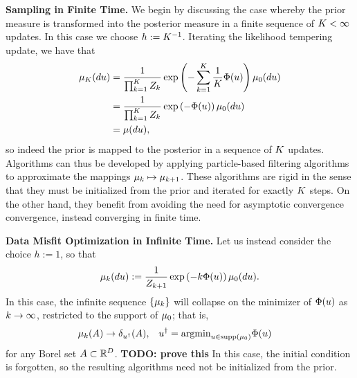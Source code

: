 \documentclass[12pt]{article}
\begin{document}
\bigskip
\noindent
\textbf{Sampling in Finite Time.} We begin by discussing the case whereby the prior measure is transformed into the posterior measure 
in a finite sequence of $K < \infty$ updates. In this case we choose $h := K^{-1}$. 
Iterating the likelihood tempering update, we have that 
\begin{align}
\mu_{K}(du) 
&= \frac{1}{\prod_{k=1}^{K} Z_{k}} \exp\left(-\sum_{k=1}^{K} \frac{1}{K} \Phi(u)  \right) \mu_0(du) \nonumber \\
&= \frac{1}{\prod_{k=1}^{K} Z_{k}} \exp\left(-\Phi(u)  \right) \mu_0(du) \nonumber \\
&= \mu(du),
\end{align}
so indeed the prior is mapped to the posterior in a sequence of $K$ updates. 
Algorithms can thus be developed by applying particle-based filtering algorithms to approximate the mappings $\mu_{k} \mapsto \mu_{k+1}$.  
These algorithms are rigid in the sense that they must be initialized from the prior and iterated for exactly $K$ steps. On the other hand, they benefit from 
avoiding the need for asymptotic convergence convergence, instead converging in finite time. 

\bigskip
\noindent
\textbf{Data Misfit Optimization in Infinite Time.} Let us instead consider the choice $h := 1$, so that  
\begin{align} 
\mu_{k}(du) := \frac{1}{Z_{k+1}} \exp\left(-k \Phi(u) \right) \mu_0(du).
\end{align}
In this case, the infinite sequence $\{\mu_{k}\}$ will collapse on the minimizer of $\Phi(u)$ as $k \to \infty$, 
restricted to the support of $\mu_0$; that is, 
\begin{align*}
&\mu_{k}(A) \to \delta_{u^\dagger}(A), &&u^{\dagger} = \text{argmin}_{u \in \text{supp}(\mu_0)} \Phi(u)
\end{align*}
for any Borel set $A \subset \mathbb{R}^{D}$. \textbf{TODO: prove this} In this case, the initial condition is forgotten, so the resulting algorithms 
need not be initialized from the prior. 
\end{document}
